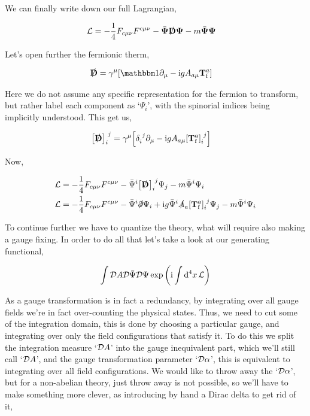 We can finally write down our full Lagrangian,

\begin{align}
    \mathcal L&=-\frac14F_{c\mu\nu}F^{c\mu\nu} -\bar{\boldsymbol\Psi}\slashed{\vb D}\boldsymbol\Psi-m\bar{\boldsymbol\Psi}\boldsymbol\Psi\nonumber
\end{align}

Let's open further the fermionic therm,

\begin{align}
    \slashed{\vb D}&=\gamma^\mu\qty[\mathbbm 1\partial_\mu-\im g A_{a\mu}\vb T^a_{\textnormal f}]\nonumber
\end{align}

Here we do not assume any specific representation for the fermion to transform, but rather label each component as `$\Psi_i$', with the spinorial indices being implicitly understood. This get us,

\begin{align}
    \tensor{\qty[\slashed{\vb D}]}{_i^j}&=\gamma^\mu\qty[\tensor{\delta}{_i^j}\partial_\mu-\im g A_{a\mu}\tensor{\qty[\vb T^a_{\textnormal f}]}{_i^j}]\nonumber
\end{align}

Now,

\begin{align}
    \mathcal L&=-\frac14F_{c\mu\nu}F^{c\mu\nu} -\bar{\Psi}^i\tensor{\qty[\slashed{\vb D}]}{_i^j}\Psi_j-m\bar\Psi^i\Psi_i\nonumber\\
    \mathcal L&=-\frac14F_{c\mu\nu}F^{c\mu\nu} -\bar{\Psi}^i\slashed\partial\Psi_i+\im g\bar{\Psi}^i\slashed A_a\tensor{\qty[\vb T^a_{\textnormal f}]}{_i^j}\Psi_j-m\bar\Psi^i\Psi_i\nonumber
\end{align}

To continue further we have to quantize the theory, what will require also making a gauge fixing. In order to do all that let's take a look at our generating functional,

\begin{align}
    \int\mathcal D A\mathcal D \bar\Psi\mathcal D \Psi\exp\qty(\textnormal{i}\int\dd[4]{x}\mathcal L)
\end{align}

As a gauge transformation is in fact a redundancy, by integrating over all gauge fields we're in fact over-counting the physical states. Thus, we need to cut some of the integration domain, this is done by choosing a particular gauge, and integrating over only the field configurations that satisfy it. To do this we split the integration measure `$\mathcal D A$' into the gauge inequivalent part, which we'll still call `$\mathcal D A$', and the gauge transformation parameter `$\mathcal D \alpha$', this is equivalent to integrating over all field configurations. We would like to throw away the `$\mathcal D \alpha$', but for a non-abelian theory, just throw away is not possible, so we'll have to make something more clever, as introducing by hand a Dirac delta to get rid of it,

